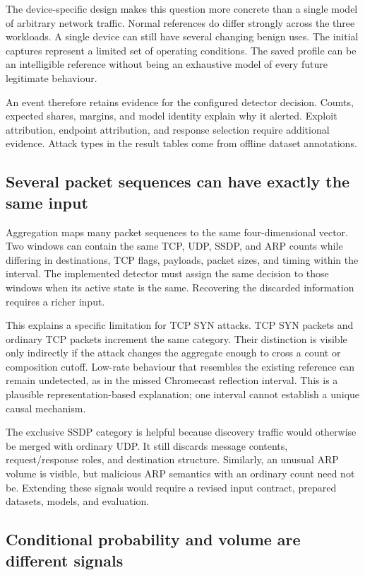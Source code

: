 The device-specific design makes this question more concrete than a
single model of arbitrary network traffic. Normal references do differ
strongly across the three workloads. A single device can still have
several changing benign uses. The initial captures
represent a limited set of operating conditions. The saved profile
can be an intelligible reference without being an exhaustive model
of every future legitimate behaviour.

An event therefore retains evidence for the configured detector decision.
Counts, expected shares, margins, and model identity explain why it alerted.
Exploit attribution, endpoint attribution, and response selection require
additional evidence. Attack types in the result tables come from offline
dataset annotations.

\subsection{Several packet sequences can have exactly the same input}

Aggregation maps many packet sequences to the same four-dimensional
vector. Two windows can contain the same TCP, UDP, SSDP, and ARP counts
while differing in destinations, TCP flags, payloads, packet sizes,
and timing within the interval. The implemented detector must assign
the same decision to those windows when its active state is the
same. Recovering the discarded information requires a richer input.

This explains a specific limitation for TCP SYN attacks. TCP SYN
packets and ordinary TCP packets increment the same category. Their
distinction is visible only indirectly if the attack changes the
aggregate enough to cross a count or composition cutoff. Low-rate
behaviour that resembles the existing reference can remain undetected,
as in the missed Chromecast reflection interval. This is a plausible
representation-based explanation; one interval cannot establish a unique
causal mechanism.

The exclusive SSDP category is helpful because discovery traffic
would otherwise be merged with ordinary UDP. It still discards
message contents, request/response roles, and destination structure.
Similarly, an unusual ARP volume is visible, but malicious ARP
semantics with an ordinary count need not be. Extending these signals
would require a revised input contract, prepared datasets, models,
and evaluation.

\subsection{Conditional probability and volume are different signals}

